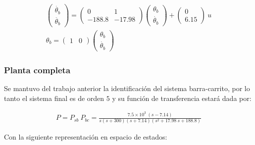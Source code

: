 \documentclass[a4paper,10pt]{article}
\begin{document}
\begin{gather*}
    \begin{pmatrix} \dot{\theta_b} \\ \ddot{\theta_b} \end{pmatrix} = 
    \begin{pmatrix}
          0 & 1 \\
        -188.8 & -17.98
    \end{pmatrix} 
    \begin{pmatrix} \theta_b \\ \dot{\theta_b} \end{pmatrix} +
    \begin{pmatrix} 0 \\ 6.15 \end{pmatrix} ~ u \\
    \theta_b = \begin{pmatrix} 1 & 0 \end{pmatrix}
    \begin{pmatrix} \theta_b \\ \dot{\theta_b} \end{pmatrix}
\end{gather*}

\subsubsection{Planta completa}

Se mantuvo del trabajo anterior la identificación del sistema barra-carrito, por lo tanto el sistema final es de orden $5$ y su función de transferencia estará dada por:

\begin{align*}
    P = P_{sb} ~ P_{bc} = \frac{7.5 \times 10^3 ~ (s - 7.14)}{s (s + 300) (s + 7.14) (s^2 + 17.98 ~ s + 188.8)}
\end{align*}

Con la siguiente representación en espacio de estados:
\end{document}
